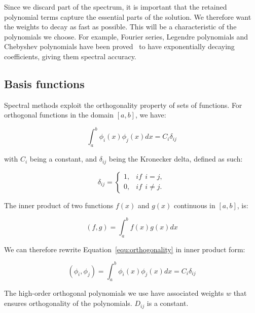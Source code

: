 Since we discard part of the spectrum, it is important that the retained polynomial terms capture
the essential parts of the solution. We therefore want the weights to decay as fast as possible.
This will be a characteristic of the polynomials we choose. For example, Fourier series, Legendre
polynomials and Chebyshev polynomials have been proved~\cite{Kopriva2009} to have exponentially
decaying coefficients, giving them spectral accuracy.

\subsection{Basis functions} \label{subsection:spectral_element_method:spectral_approximation:basis_functions}

Spectral methods exploit the orthogonality property of sets of functions. For orthogonal
functions in the domain $[a, b]$, we have:

\begin{equation} \label{equ:orthogonality}
	\int_{a}^{b}\phi_i(x) \phi_j(x)dx = C_i \delta_{i j}
\end{equation}

\noindent
with $C_i$ being a constant, and $\delta_{i j}$ being the Kronecker delta, defined as such:

\begin{equation} \label{equ:kronecker}
	\delta _{ij} = \left\{ \begin{matrix}
                    1, & if \:\: i = j,\\ 
                    0, & if \:\: i \neq j.
                    \end{matrix} \right.
\end{equation}

The inner product of two functions $f \left( x \right)$ and $g \left( x \right)$ continuous in
$\left[ a, b \right]$, is:

\begin{equation}
    \left( f, g \right) = \int_{a}^{b}f(x)g(x)dx
\end{equation}

\noindent
We can therefore rewrite Equation~\ref{equ:orthogonality} in inner product form:

\begin{equation}
	\left( \phi_i, \phi_j \right) = \int_{a}^{b}\phi_i(x) \phi_j(x)dx = C_i \delta_{i j}
\end{equation}

The high-order orthogonal polynomials we use have associated weights $w$ that ensures orthogonality
of the polynomials. $D_{ij}$ is a constant.

